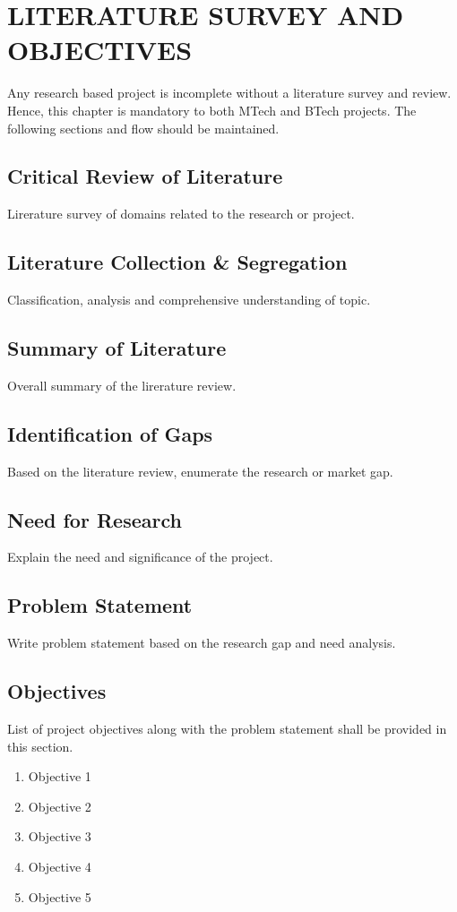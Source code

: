 
\chapter{LITERATURE SURVEY AND OBJECTIVES} %
\label{ChapterLiteratureSurvey} %

Any research based project is incomplete without a literature survey and review. Hence, this chapter is mandatory to both MTech and BTech projects.  The following sections and flow should be maintained. 

\section{Critical Review of Literature}
Lirerature survey of domains related to the research or project.

\section{Literature Collection \& Segregation}
Classification, analysis and comprehensive understanding of topic.

\section{Summary of Literature}
Overall summary of the lirerature review.

\section{Identification of Gaps}
Based on the literature review, enumerate the research  or market gap. 

\section{Need for Research}
Explain the need and significance of the project.

\section{Problem Statement}
Write problem statement based on the research gap and need analysis. 

\section{Objectives}
List of project objectives along with the problem statement shall be provided in this section.
\begin{enumerate}
	\item Objective 1
	\item Objective 2
	\item Objective 3
	\item Objective 4
	\item Objective 5
\end{enumerate}

